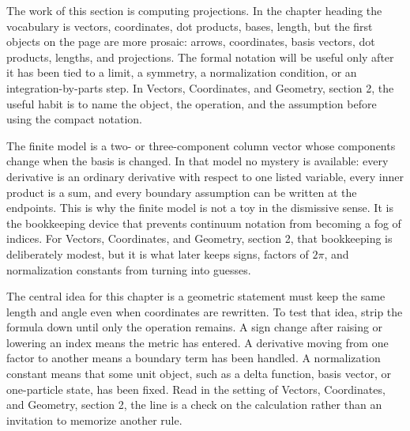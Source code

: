 











The work of this section is computing projections.  In the chapter heading the vocabulary is vectors, coordinates, dot products, bases, length, but the first objects on the page are more prosaic: arrows, coordinates, basis vectors, dot products, lengths, and projections.  The formal notation will be useful only after it has been tied to a limit, a symmetry, a normalization condition, or an integration-by-parts step.  In Vectors, Coordinates, and Geometry, section 2, the useful habit is to name the object, the operation, and the assumption before using the compact notation.

The finite model is a two- or three-component column vector whose components change when the basis is changed.  In that model no mystery is available: every derivative is an ordinary derivative with respect to one listed variable, every inner product is a sum, and every boundary assumption can be written at the endpoints.  This is why the finite model is not a toy in the dismissive sense.  It is the bookkeeping device that prevents continuum notation from becoming a fog of indices.  For Vectors, Coordinates, and Geometry, section 2, that bookkeeping is deliberately modest, but it is what later keeps signs, factors of \(2\pi\), and normalization constants from turning into guesses.

The central idea for this chapter is a geometric statement must keep the same length and angle even when coordinates are rewritten.  To test that idea, strip the formula down until only the operation remains.  A sign change after raising or lowering an index means the metric has entered.  A derivative moving from one factor to another means a boundary term has been handled.  A normalization constant means that some unit object, such as a delta function, basis vector, or one-particle state, has been fixed.  Read in the setting of Vectors, Coordinates, and Geometry, section 2, the line is a check on the calculation rather than an invitation to memorize another rule.

